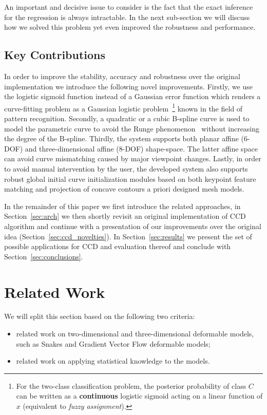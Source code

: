\documentclass[conference]{IEEEtran}
\begin{document}
An important and decisive issue to consider is the fact that the exact inference for the
regression is always intractable. In the next sub-section we will discuss how we
solved this problem yet even improved the robustness and performance. 

\subsection{Key Contributions}
In order to improve the stability, accuracy and robustness over the original
implementation we introduce the following novel improvements. Firstly, we use 
the logistic sigmoid function instead of a Gaussian error function which renders a
curve-fitting problem as a Gaussian logistic problem~\footnote{For the two-class
classification problem, the posterior probability 
of class $C$ can be written as a \textbf{continuous} logistic sigmoid acting
on a linear function of $x$ (equivalent to \textit{fuzzy assignment}).} known in the field of pattern 
recognition. Secondly, a quadratic or
a cubic B-spline curve is used to model the parametric curve
to avoid the Runge phenomenon~\cite{süli2003introduction} without increasing the degree of the
B-spline. Thirdly, the system supports both planar affine (6-DOF) and
three-dimensional affine (8-DOF) shape-space. The latter affine space can avoid
curve mismatching caused by major viewpoint changes. Lastly, in
order to avoid manual intervention by the user, the developed system
also supports robust global initial curve initialization modules based on both keypoint
feature matching and projection of concave contours a priori designed mesh models.

In the remainder of this paper we first introduce the related approaches, 
in Section~\ref{sec:arch} we then shortly revisit an original implementation of 
CCD algorithm and continue with a presentation of our improvements over the
original idea (Section~\ref{sec:ccd_novelties}). In Section~\ref{sec:results}
we present the set of possible applications for CCD and evaluation thereof and
conclude with Section~\ref{sec:conclusions}.

\section{Related Work}
\label{sec:rw}
We will split this section based on the following two criteria:
\begin{itemize}
\item related work on two-dimensional and three-dimensional deformable models,
  such as Snakes and Gradient Vector Flow deformable models;
\item related work on applying statistical knowledge to the models.
\end{itemize}
\end{document}
